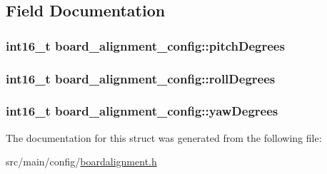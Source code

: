 \subsection{Field Documentation}
\hypertarget{structboard__alignment__config_ade4804024d1b829340dd2dc2633d4da6}{
\subsubsection[{pitch\+Degrees}]{\setlength{\rightskip}{0pt plus 5cm}int16\+\_\+t board\+\_\+alignment\+\_\+config\+::pitch\+Degrees}}\label{structboard__alignment__config_ade4804024d1b829340dd2dc2633d4da6}
\hypertarget{structboard__alignment__config_a78e26c037b7145c91a4823ac790b8611}{
\subsubsection[{roll\+Degrees}]{\setlength{\rightskip}{0pt plus 5cm}int16\+\_\+t board\+\_\+alignment\+\_\+config\+::roll\+Degrees}}\label{structboard__alignment__config_a78e26c037b7145c91a4823ac790b8611}
\hypertarget{structboard__alignment__config_aaea0b7deffaba0730f8fc3e4118dde40}{
\subsubsection[{yaw\+Degrees}]{\setlength{\rightskip}{0pt plus 5cm}int16\+\_\+t board\+\_\+alignment\+\_\+config\+::yaw\+Degrees}}\label{structboard__alignment__config_aaea0b7deffaba0730f8fc3e4118dde40}


The documentation for this struct was generated from the following file\+:\begin{DoxyCompactItemize}
\item 
src/main/config/\hyperlink{config_2boardalignment_8h}{boardalignment.\+h}\end{DoxyCompactItemize}
